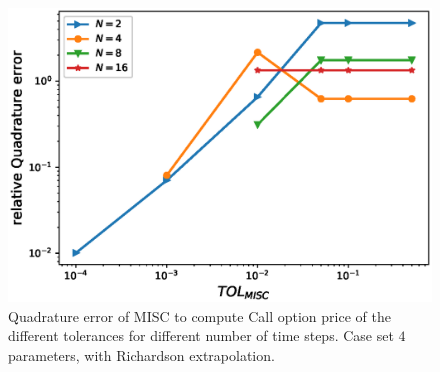 \documentclass[11pt]{article}
\begin{document}
\begin{figure}[h!]
\centering
\includegraphics[width=0.7\linewidth]{./figures/rBergomi_MISC_quadratre_error/vs_TOL/set4/relative_quad_error_wrt_MISC_TOL_set4_with_rich}


\caption{Quadrature error of MISC to compute Call option price of the different tolerances for different number of time steps. Case set $4$ parameters, with Richardson extrapolation.}
\label{fig:Quadrature_error_set4_rich}
\end{figure}
\end{document}
